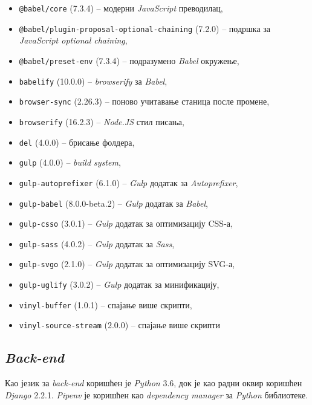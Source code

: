 \vspace{0.2cm}
\begin{itemize}[noitemsep]
    \item \verb|@babel/core| (7.3.4) -- модерни \textit{JavaScript} преводилац,
    \item \verb|@babel/plugin-proposal-optional-chaining| (7.2.0) --
        подршка за \textit{JavaScript optional chaining},
    \item \verb|@babel/preset-env| (7.3.4) -- подразумено \textit{Babel}
        окружење,
    \item \verb|babelify| (10.0.0) -- \textit{browserify} за \textit{Babel},
    \item \verb|browser-sync| (2.26.3) -- поново учитавање станица после
        промене,
    \item \verb|browserify| (16.2.3) -- \textit{Node.JS} стил писања,
    \item \verb|del| (4.0.0) -- брисање фолдера,
    \item \verb|gulp| (4.0.0) -- \textit{build system},
    \item \verb|gulp-autoprefixer| (6.1.0) -- \textit{Gulp} додатак за
        \textit{Autoprefixer},
    \item \verb|gulp-babel| (8.0.0-beta.2) -- \textit{Gulp} додатак за
        \textit{Babel},
    \item \verb|gulp-csso| (3.0.1) -- \textit{Gulp} додатак за оптимизацију
        CSS-а,
    \item \verb|gulp-sass| (4.0.2) -- \textit{Gulp} додатак за \textit{Sass},
    \item \verb|gulp-svgo| (2.1.0) -- \textit{Gulp} додатак за оптимизацију
        SVG-а,
    \item \verb|gulp-uglify| (3.0.2) -- \textit{Gulp} додатак за минификацију,
    \item \verb|vinyl-buffer| (1.0.1) -- спајање више скрипти,
    \item \verb|vinyl-source-stream| (2.0.0) -- спајање више скрипти
\end{itemize}

\subsection{\textit{Back-end}}

Као језик за \textit{back-end} коришћен је \textit{Python} 3.6, док је као радни
оквир коришћен \textit{Django} 2.2.1. \textit{Pipenv} је коришћен као
\textit{dependency manager} за \textit{Python} библиотеке.


